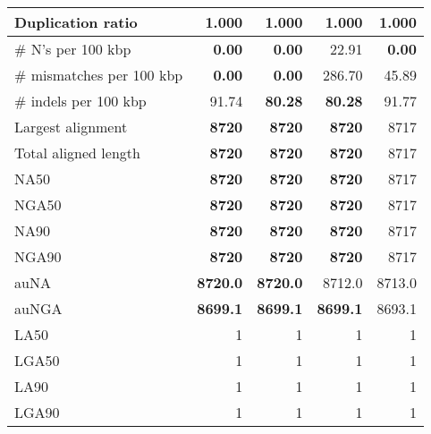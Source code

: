 \documentclass[12pt,a4paper]{article}
\begin{document}
\begin{table}[ht]
\begin{center}
\begin{tabular}{|l*{4}{|r}|}
Duplication ratio & 1.000 & 1.000 & 1.000 & 1.000 \\ \hline
\# N's per 100 kbp & {\bf 0.00} & {\bf 0.00} & 22.91 & {\bf 0.00} \\ \hline
\# mismatches per 100 kbp & {\bf 0.00} & {\bf 0.00} & 286.70 & 45.89 \\ \hline
\# indels per 100 kbp & 91.74 & {\bf 80.28} & {\bf 80.28} & 91.77 \\ \hline
Largest alignment & {\bf 8720} & {\bf 8720} & {\bf 8720} & 8717 \\ \hline
Total aligned length & {\bf 8720} & {\bf 8720} & {\bf 8720} & 8717 \\ \hline
NA50 & {\bf 8720} & {\bf 8720} & {\bf 8720} & 8717 \\ \hline
NGA50 & {\bf 8720} & {\bf 8720} & {\bf 8720} & 8717 \\ \hline
NA90 & {\bf 8720} & {\bf 8720} & {\bf 8720} & 8717 \\ \hline
NGA90 & {\bf 8720} & {\bf 8720} & {\bf 8720} & 8717 \\ \hline
auNA & {\bf 8720.0} & {\bf 8720.0} & 8712.0 & 8713.0 \\ \hline
auNGA & {\bf 8699.1} & {\bf 8699.1} & {\bf 8699.1} & 8693.1 \\ \hline
LA50 & 1 & 1 & 1 & 1 \\ \hline
LGA50 & 1 & 1 & 1 & 1 \\ \hline
LA90 & 1 & 1 & 1 & 1 \\ \hline
LGA90 & 1 & 1 & 1 & 1 \\ \hline
\end{tabular}
\end{center}
\end{table}
\end{document}
